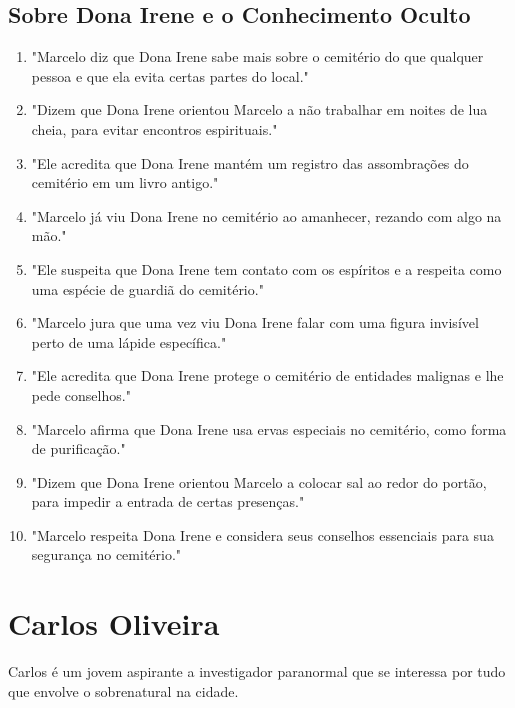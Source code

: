 \subsection*{Sobre Dona Irene e o Conhecimento Oculto}
\begin{enumerate}
    \item "Marcelo diz que Dona Irene sabe mais sobre o cemitério do que qualquer pessoa e que ela evita certas partes do local."
    \item "Dizem que Dona Irene orientou Marcelo a não trabalhar em noites de lua cheia, para evitar encontros espirituais."
    \item "Ele acredita que Dona Irene mantém um registro das assombrações do cemitério em um livro antigo."
    \item "Marcelo já viu Dona Irene no cemitério ao amanhecer, rezando com algo na mão."
    \item "Ele suspeita que Dona Irene tem contato com os espíritos e a respeita como uma espécie de guardiã do cemitério."
    \item "Marcelo jura que uma vez viu Dona Irene falar com uma figura invisível perto de uma lápide específica."
    \item "Ele acredita que Dona Irene protege o cemitério de entidades malignas e lhe pede conselhos."
    \item "Marcelo afirma que Dona Irene usa ervas especiais no cemitério, como forma de purificação."
    \item "Dizem que Dona Irene orientou Marcelo a colocar sal ao redor do portão, para impedir a entrada de certas presenças."
    \item "Marcelo respeita Dona Irene e considera seus conselhos essenciais para sua segurança no cemitério."
\end{enumerate}

\section{Carlos Oliveira}
Carlos é um jovem aspirante a investigador paranormal que se interessa por tudo que envolve o sobrenatural na cidade.

